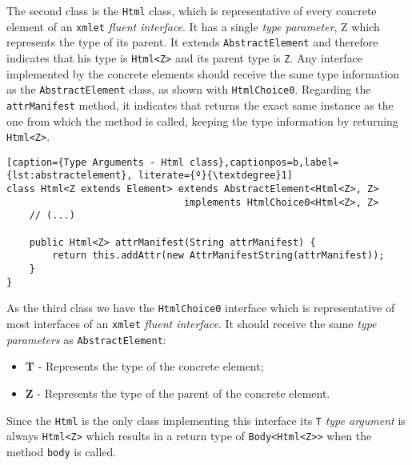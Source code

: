 \noindent
The second class is the \texttt{Html} class, which is representative of every concrete element of an \texttt{xmlet} \textit{fluent interface}. It has a single \textit{type parameter}, Z which represents the type of its parent. It extends \texttt{AbstractElement} and therefore indicates that his type is \texttt{Html<Z>} and its parent type is \texttt{Z}. Any  interface implemented by the concrete elements should receive the same type information as the \texttt{AbstractElement} class, as shown with \texttt{HtmlChoice0}. Regarding the \texttt{attrManifest} method, it indicates that returns the exact same instance as the one from which the method is called, keeping the type information by returning \texttt{Html<Z>}.

\bigskip


\begin{minipage}{\linewidth}
\begin{lstlisting}[caption={Type Arguments - Html class},captionpos=b,label={lst:abstractelement}, literate={º}{\textdegree}1]
class Html<Z extends Element> extends AbstractElement<Html<Z>, Z>
                               implements HtmlChoice0<Html<Z>, Z>
    // (...)
    
    public Html<Z> attrManifest(String attrManifest) {
        return this.addAttr(new AttrManifestString(attrManifest));
    }
}
\end{lstlisting}
\end{minipage}

\noindent
As the third class we have the \texttt{HtmlChoice0} interface which is representative of most interfaces of an \texttt{xmlet} \textit{fluent interface}. It should receive the same \textit{type parameters} as \texttt{AbstractElement}:

\begin{itemize}
	\item \textbf{T} - Represents the type of the concrete element; 
	\item \textbf{Z} - Represents the type of the parent of the concrete element.
\end{itemize}	

\noindent
Since the \texttt{Html} is the only class implementing this interface its \texttt{T} \textit{type argument} is always \texttt{Html<Z>} which results in a return type of \texttt{Body<Html<Z>}\texttt{>} when the method \texttt{body} is called. 


